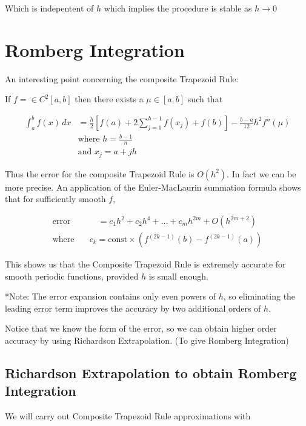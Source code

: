 \documentclass[12pt]{article}
\begin{document}
Which is indepentent of $h$ which implies the procedure is stable as $h\to 0$

\section{Romberg Integration}
\label{sec:romberg_integration}
An interesting point concerning the composite Trapezoid Rule:

If $f= \in C^2[a,b]$ then there exists a $\mu \in [a,b]$ such that 

\begin{align*}
  \int_{a}^{b} f(x) \, dx &= \frac{h}{2} \left[
    f(a) + 2 \sum_{j=1}^{h-1} f(x_j) + f(b)
  \right] - \frac{b-a}{12}h^2 f''(\mu) \\
                          &\text{where } h = \frac{b-1}{n} \\
                          &\text{and } x_j = a + jh
\end{align*}

Thus the error for the composite Trapezoid Rule is $O(h^2)$. In fact we can be
more precise. An application of the Euler-MacLaurin summation formula shows that
for sufficiently smooth $f$,

\begin{align*}
  \text{error} \quad&\quad= c_1 h^2 + c_2 h^4 + \dots + c_m h^{2m} + O(h^{2m+2}) \\
  \text{where}\quad &c_k = \text{const} \times \left(
    f^{(2k-1)}(b) - f^{(2k-1)}(a)
  \right)
\end{align*}

This shows us that the Composite Trapezoid Rule is extremely accurate for smooth
periodic functions, provided $h$ is small enough.

*Note: The error expansion contains only even powers of $h$, so eliminating the 
leading error term improves the accuracy by two additional orders of $h$.

Notice that we know the form of the error, so we can obtain higher order
accuracy by using Richardson Extrapolation. (To give Romberg Integration)

\subsection{Richardson Extrapolation to obtain Romberg Integration}
\label{sec:richardson_extrapolation_to_obtain_romberg_integration}

We will carry out Composite Trapezoid Rule approximations with 
\end{document}
